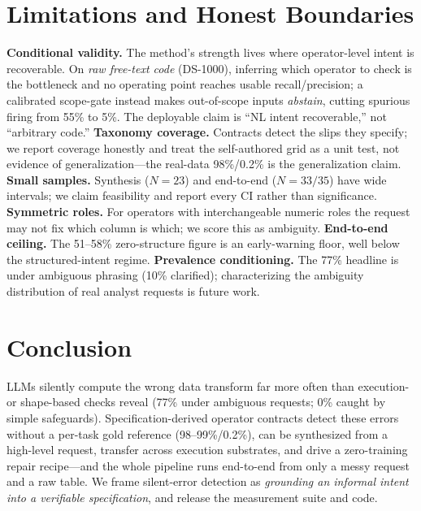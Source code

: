 \documentclass[10pt,twocolumn,letterpaper]{article}
\begin{document}
\section{Limitations and Honest Boundaries}\label{sec:limits}
\textbf{Conditional validity.} The method's strength lives where operator-level
intent is recoverable. On \emph{raw free-text code} (DS-1000), inferring which
operator to check is the bottleneck and no operating point reaches usable
recall/precision; a calibrated scope-gate instead makes out-of-scope inputs
\emph{abstain}, cutting spurious firing from 55\% to 5\%. The deployable claim is
``NL intent recoverable,'' not ``arbitrary code.''
\textbf{Taxonomy coverage.} Contracts detect the slips they specify; we report
coverage honestly and treat the self-authored grid as a unit test, not evidence
of generalization---the real-data 98\%/0.2\% is the generalization claim.
\textbf{Small samples.} Synthesis ($N{=}23$) and end-to-end ($N{=}33/35$) have
wide intervals; we claim feasibility and report every CI rather than
significance. \textbf{Symmetric roles.} For operators with interchangeable
numeric roles the request may not fix which column is which; we score this as
ambiguity. \textbf{End-to-end ceiling.} The 51--58\% zero-structure figure is an
early-warning floor, well below the structured-intent regime.
\textbf{Prevalence conditioning.} The 77\% headline is under ambiguous phrasing
(10\% clarified); characterizing the ambiguity distribution of real analyst
requests is future work.

\section{Conclusion}
LLMs silently compute the wrong data transform far more often than execution- or
shape-based checks reveal (77\% under ambiguous requests; 0\% caught by simple
safeguards). Specification-derived operator contracts detect these errors without
a per-task gold reference (98--99\%/0.2\%), can be synthesized from a high-level
request, transfer across execution substrates, and drive a zero-training repair
recipe---and the whole pipeline runs end-to-end from only a messy request and a
raw table. We frame silent-error detection as \emph{grounding an informal intent
into a verifiable specification}, and release the measurement suite and code.
\end{document}
